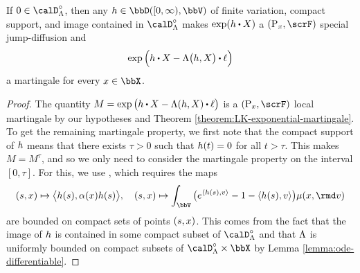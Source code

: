 \begin{theorem}
  \label{theorem:exponential-martingale}
  If $0 \in \odeSpace^\circ$, then any $\twistFunc \in \pathSpace{[0,\infty)}{\vecSpace}$ of finite variation, compact support, and image contained in $\odeSpace^\circ$ makes $\exp(\twistFunc \shortInt \X)$ a $(\Prb_\stateVar, \scrF)$ special jump-diffusion and
  \begin{equation*}
    \exp\Big( \twistFunc \shortInt \X - \ode\big(\twistFunc, \X\big) \shortInt \leb \Big)
  \end{equation*}
  a martingale for every $\stateVar \in \stateSpace$.
\end{theorem}
\begin{proof}
  The quantity $M = \exp\big(\twistFunc \shortInt \X - \ode(\twistFunc, \X) \shortInt \leb \big)$ is a $(\Prb_\stateVar, \scrF)$ local martingale by our hypotheses and Theorem \ref{theorem:LK-exponential-martingale}.
  To get the remaining martingale property, we first note that the compact support of $h$ means that there exists $\tau > 0$ such that $h(t) = 0$ for all $t > \tau$.
  This makes $M = M^\tau$, and so we only need to consider the martingale property on the interval $[0,\tau]$.
  For this, we use \cite[Theorem 2.6]{spreij2010}, which requires the maps
  \begin{equation*}
    (s, \stateVar) \mapsto \bprj{\twistFunc(s)}{\affDiff(\stateVar)\twistFunc(s)}, \quad 
    (s, \stateVar) \mapsto \int_\vecSpace \big( e^\prj{\twistFunc(s)}{\markVar} - 1 - \prj{\twistFunc(s)}{\markVar} \big) \affJump(\stateVar, \rmd\markVar)
  \end{equation*}
  are bounded on compact sets of points $(s, x)$.
  This comes from the fact that the image of $h$ is contained in some compact subset of $\odeSpace^\circ$ and that $\Lambda$ is uniformly bounded on compact subsets of $\odeSpace^\circ \times \stateSpace$ by Lemma \ref{lemma:ode-differentiable}.
\end{proof}
